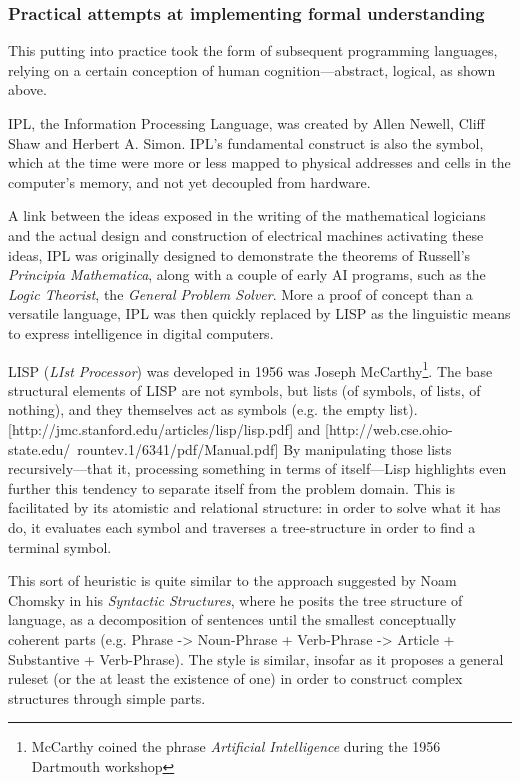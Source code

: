\subsubsection{Practical attempts at implementing formal understanding}

This putting into practice took the form of subsequent programming languages, relying on a certain conception of human cognition—abstract, logical, as shown above.

IPL, the Information Processing Language, was created by Allen Newell, Cliff Shaw and Herbert A. Simon. IPL's fundamental construct is also the symbol, which at the time were more or less mapped to physical addresses and cells in the computer's memory, and not yet decoupled from hardware.

A link between the ideas exposed in the writing of the mathematical logicians and the actual design and construction of electrical machines activating these ideas, IPL was originally designed to demonstrate the theorems of Russell's \emph{Principia Mathematica}, along with a couple of early AI programs, such as the \emph{Logic Theorist}, the \emph{General Problem Solver}. More a proof of concept than a versatile language, IPL was then quickly replaced by LISP as the linguistic means to express intelligence in digital computers.

LISP (\emph{LIst Processor}) was developed in 1956 was Joseph McCarthy\footnote{McCarthy coined the phrase \emph{Artificial Intelligence} during the 1956 Dartmouth workshop}. The base structural elements of LISP are not symbols, but lists (of symbols, of lists, of nothing), and they themselves act as symbols (e.g. the empty list). [http://jmc.stanford.edu/articles/lisp/lisp.pdf] and [http://web.cse.ohio-state.edu/~rountev.1/6341/pdf/Manual.pdf] By manipulating those lists recursively—that it, processing something in terms of itself—Lisp highlights even further this tendency to separate itself from the problem domain. This is facilitated by its atomistic and relational structure: in order to solve what it has do, it evaluates each symbol and traverses a tree-structure in order to find a terminal symbol.

This sort of heuristic is quite similar to the approach suggested by Noam Chomsky in his \emph{Syntactic Structures}, where he posits the tree structure of language, as a decomposition of sentences until the smallest conceptually coherent parts (e.g. Phrase -> Noun-Phrase + Verb-Phrase -> Article + Substantive + Verb-Phrase). The style is similar, insofar as it proposes a general ruleset (or the at least the existence of one) in order to construct complex structures through simple parts.

